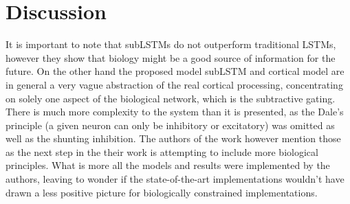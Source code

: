 \section{Discussion}
It is important to note that subLSTMs do not outperform traditional LSTMs, however they show that biology might be a good source of information for the future.
On the other hand the proposed model subLSTM and cortical model are in general a very vague abstraction of the real cortical processing, concentrating on solely one aspect of the biological network, which is the subtractive gating. There is much more complexity to the system than it is presented, as the Dale's principle (a given neuron can only be inhibitory or excitatory) was omitted as well as the shunting inhibition. The authors of the work however mention those as the next step in the their work is attempting to include more biological principles.
What is more all the models and results were implemented by the authors, leaving to wonder if the state-of-the-art implementations wouldn't have drawn a less positive picture for biologically constrained implementations.